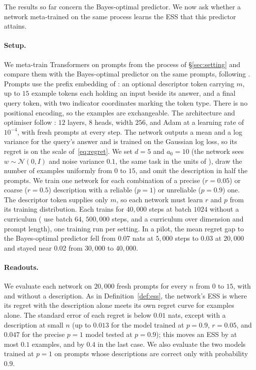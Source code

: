 \documentclass[10pt]{article}
\begin{document}
The results so far concern the Bayes-optimal predictor. We now ask whether a network meta-trained on the same process learns the ESS that this predictor attains.

\paragraph{Setup.}
We meta-train Transformers on prompts from the process of \S\ref{sec:setting} and compare them with the Bayes-optimal predictor on the same prompts, following \citet{genewein2025}. Prompts use the prefix embedding of \citet{huangge2025}: an optional descriptor token carrying $m$, up to $15$ example tokens each holding an input beside its answer, and a final query token, with two indicator coordinates marking the token type. There is no positional encoding, so the examples are exchangeable. The architecture and optimiser follow \citet{garg2022}: $12$ layers, $8$ heads, width $256$, and Adam at a learning rate of $10^{-4}$, with fresh prompts at every step. The network outputs a mean and a log variance for the query's answer and is trained on the Gaussian log loss, so its regret is on the scale of~\eqref{eq:regret}. We set $d = 5$ and $a_0 = 10$ (the network sees $w \sim \mathcal{N}(0, I)$ and noise variance $0.1$, the same task in the units of \citet{garg2022}), draw the number of examples uniformly from $0$ to $15$, and omit the description in half the prompts. We train one network for each combination of a precise ($r = 0.05$) or coarse ($r = 0.5$) description with a reliable ($p = 1$) or unreliable ($p = 0.9$) one. The descriptor token supplies only $m$, so each network must learn $r$ and $p$ from its training distribution. Each trains for $40{,}000$ steps at batch $1024$ without a curriculum (\citet{garg2022} use batch $64$, $500{,}000$ steps, and a curriculum over dimension and prompt length), one training run per setting. In a pilot, the mean regret gap to the Bayes-optimal predictor fell from $0.07$ nats at $5{,}000$ steps to $0.03$ at $20{,}000$ and stayed near $0.02$ from $30{,}000$ to $40{,}000$.

\paragraph{Readouts.}
We evaluate each network on $20{,}000$ fresh prompts for every $n$ from $0$ to $15$, with and without a description. As in Definition~\ref{def:ess}, the network's ESS is where its regret with the description alone meets its own regret curve for examples alone. The standard error of each regret is below $0.01$ nats, except with a description at small $n$ (up to $0.013$ for the model trained at $p = 0.9$, $r = 0.05$, and $0.047$ for the precise $p = 1$ model tested at $p = 0.9$); this moves an ESS by at most $0.1$ examples, and by $0.4$ in the last case. We also evaluate the two models trained at $p = 1$ on prompts whose descriptions are correct only with probability $0.9$.
\end{document}
